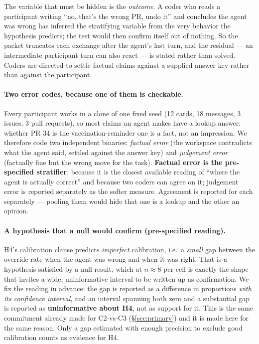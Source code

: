 \documentclass[11pt]{article}
\begin{document}
The variable that must be hidden is the \emph{outcome}. A coder who reads a
participant writing ``no, that's the wrong PR, undo it'' and concludes the agent
was wrong has inferred the stratifying variable from the very behavior the
hypothesis predicts; the test would then confirm itself out of nothing. So the
packet truncates each exchange after the agent's last turn, and the residual ---
an intermediate participant turn can also react --- is stated rather than solved.
Coders are directed to settle factual claims against a supplied answer key
rather than against the participant.

\paragraph{Two error codes, because one of them is checkable.} Every participant
works in a clone of one fixed seed (12 cards, 18 messages, 3 issues, 3 pull
requests), so most claims an agent makes have a lookup answer: whether PR 34 is
the vaccination-reminder one is a fact, not an impression. We therefore code two
independent binaries: \emph{factual error} (the workspace contradicts what the
agent said, settled against the answer key) and \emph{judgement error}
(factually fine but the wrong move for the task). \textbf{Factual error is the
pre-specified stratifier}, because it is the closest available reading of ``where
the agent is actually correct'' and because two coders can agree on it;
judgement error is reported separately as the softer measure. Agreement is
reported for each separately --- pooling them would hide that one is a lookup and
the other an opinion.

\paragraph{A hypothesis that a null would confirm (pre-specified reading).} H4's
calibration clause predicts \emph{imperfect} calibration, i.e.\ a
\emph{small} gap between the override rate when the agent was wrong and when it
was right. That is a hypothesis satisfied by a null result, which at
$n \approx 8$ per cell is exactly the shape that invites a wide, uninformative
interval to be written up as confirmation. We fix the reading in advance: the
gap is reported as a difference in proportions \emph{with its confidence
interval}, and an interval spanning both zero and a substantial gap is reported
as \textbf{uninformative about H4}, not as support for it. This is the same
commitment already made for C2-vs-C3 (\S\ref{sec:primary}) and it is made here
for the same reason. Only a gap estimated with enough precision to exclude
good calibration counts as evidence for H4.
\end{document}
